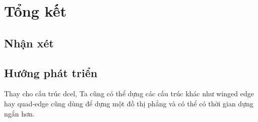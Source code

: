 \section{Tổng kết}
\subsection{Nhận xét}
\subsection{Hướng phát triển}
Thay cho cấu trúc dcel, Ta cũng có thể dựng các cấu trúc khác như winged edge hay quad-edge cũng dùng để dựng một đồ thị phẳng và có thể có thời gian dựng ngắn hơn.

